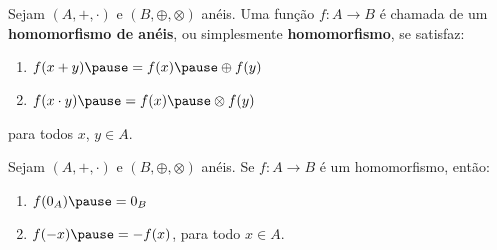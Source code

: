 \documentclass{beamer}
\begin{document}
    \begin{frame}
        \begin{definicao}
            Sejam $(A, +, \cdot)$ \pause e $(B, \oplus, \otimes)$ \pause anéis. \pause Uma função $f : A \to B$ \pause é chamada de um \textbf{homomorfismo de anéis}, \pause ou simplesmente \textbf{homomorfismo}, \pause se satisfaz:\pause
            \begin{enumerate}[label={\roman*})]
                \item $f(x + y) \pause = f(x) \pause \oplus f(y)$\pause

                \vspace{.5cm}

                \item $f(x \cdot y) \pause = f(x) \pause \otimes f(y)$\pause

                \vspace{.5cm}
            \end{enumerate}
            para todos $x$, $y \in A$.\pause
        \end{definicao}
    \end{frame}

    \begin{frame}
        \begin{proposicao}
            Sejam $(A, +, \cdot)$ e $(B, \oplus, \otimes)$ anéis. \pause Se $f : A \to B$ é um homomorfismo, \pause então:\pause
            \begin{enumerate}[label={\roman*})]
                \item $f(0_{A}) \pause = 0_{B}$\pause

                \vspace{.5cm}

                \item $f(-x) \pause = -f(x)$, \pause para todo $x \in A$.\pause
            \end{enumerate}
        \end{proposicao}
    \end{frame}
\end{document}
